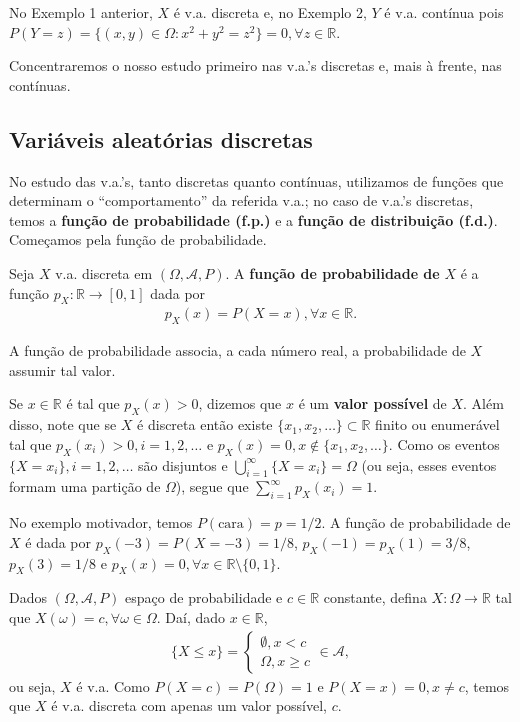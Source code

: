 \documentclass[../Notas.tex]{subfiles}
\begin{document}
\begin{example}
No Exemplo 1 anterior, $X$ é v.a. discreta e, no Exemplo 2, $Y$ é v.a. contínua pois $P(Y=z) = \{ (x,y)\in\Omega : x^2 + y^2 = z^2 \} = 0, \forall z\in\mathbb{R}$.
\end{example}

Concentraremos o nosso estudo primeiro nas v.a.'s discretas e, mais à frente, nas contínuas.

\subsection{Variáveis aleatórias discretas}
No estudo das v.a.'s, tanto discretas quanto contínuas, utilizamos de funções que determinam o ``comportamento'' da referida v.a.; no caso de v.a.'s discretas, temos a \textbf{função de probabilidade (f.p.)} e a \textbf{função de distribuição (f.d.)}. Começamos pela função de probabilidade.
\begin{definition}
Seja $X$ v.a. discreta em $(\Omega, \mathcal{A}, P)$. A \textbf{função de probabilidade de } $X$ é a função $p_X:\mathbb{R}\to [0,1]$ dada por
\begin{align*}
    p_X(x) = P(X=x), \forall x\in\mathbb{R}.
\end{align*}
\end{definition}
A função de probabilidade associa, a cada número real, a probabilidade de $X$ assumir tal valor.
\begin{remark}
Se $x\in\mathbb{R}$ é tal que $p_X(x) > 0$, dizemos que $x$ é um \textbf{valor possível} de $X$. Além disso, note que se $X$ é discreta então existe $\{ x_1, x_2, \dots \}\subset\mathbb{R}$ finito ou enumerável tal que $p_X(x_i) > 0, i=1,2,\dots$ e $p_X(x) = 0, x\notin\{x_1, x_2, \dots\}$. Como os eventos $\{X = x_i\}, i=1, 2, \dots$ são disjuntos e $\displaystyle{ \bigcup_{i=1}^{\infty} \{X=x_i\} = \Omega}$ (ou seja, esses eventos formam uma partição de $\Omega$), segue que $\displaystyle{ \sum_{i=1}^{\infty}p_X(x_i) = 1 }$.
\end{remark}

\begin{example}
No exemplo motivador, temos $P(\text{cara}) = p = 1/2$. A função de probabilidade de $X$ é dada por $p_X(-3) = P(X=-3) = 1/8$, $p_X(-1) = p_X(1) = 3/8$, $p_X(3) = 1/8$ e $p_X(x) = 0, \forall x\in\mathbb{R}\setminus\{0,1\}$.
\end{example}

\begin{example}
Dados $(\Omega, \mathcal{A}, P)$ espaço de probabilidade e $c\in\mathbb{R}$ constante, defina $X:\Omega\to\mathbb{R}$ tal que $X(\omega) = c, \forall\omega\in\Omega$. Daí, dado $x\in\mathbb{R}$,
\begin{align*}
    \{X\leq x\} = \begin{cases}
    \emptyset, x < c \\
    \Omega, x\geq c
    \end{cases}\in\mathcal{A},
\end{align*}
ou seja, $X$ é v.a. Como $P(X=c) = P(\Omega) = 1$ e $P(X=x) = 0, x\neq c$, temos que $X$ é v.a. discreta com apenas um valor possível, $c$.
\end{example}
\end{document}
